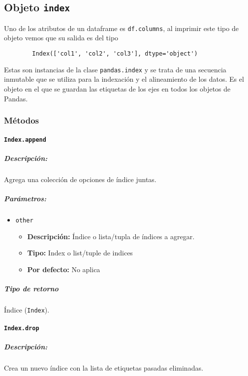 \subsection{Objeto \texttt{index}}

Uno de los atributos de un dataframe es \texttt{df.columns}, al imprimir este
tipo de objeto vemos que su salida es del tipo

\begin{verbatim}
        Index(['col1', 'col2', 'col3'], dtype='object')
        \end{verbatim}

Estas son instancias de la clase \texttt{pandas.index} y se trata de una
secuencia inmutable que se utiliza para la indexación y el alineamiento de los
datos. Es el objeto en el que se guardan las etiquetas de los ejes en todos los
objetos de Pandas.

\subsubsection{Métodos}

\paragraph{\texttt{Index.append}}

\subparagraph{Descripción:}
Agrega una colección de opciones de índice juntas.

\subparagraph{Parámetros:}

\begin{itemize}
    \item \texttt{other}
          \begin{itemize}
              \item \textbf{Descripción:} Índice o lista/tupla de índices a
                    agregar.
              \item \textbf{Tipo:} Index o list/tuple de indices
              \item \textbf{Por defecto:} No aplica
          \end{itemize}
\end{itemize}

\subparagraph{Tipo de retorno}
Índice (\texttt{Index}).

\paragraph{\texttt{Index.drop}}

\subparagraph{Descripción:}
Crea un nuevo índice con la lista de etiquetas pasadas eliminadas.

